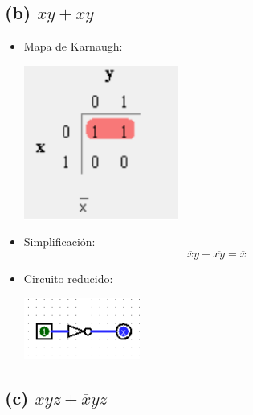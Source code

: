 \subsection*{(b) $\overline{x}y + \overline{xy}$}

\begin{itemize}
    \item Mapa de Karnaugh:
\begin{center}
    \includegraphics[width=0.4\textwidth]{recursos/Ejercicio3/mapas/mapa_b).png}
\end{center}

    \item Simplificación: \[ \overline{x}y + \overline{xy} = \overline{x} \]

    \item Circuito reducido:
\begin{center}
    \includegraphics[width=0.3\textwidth]{recursos/Ejercicio3/circuito/circuito_b).png}
\end{center}
\end{itemize}

\subsection*{(c) $xyz + \overline{x}yz$}

